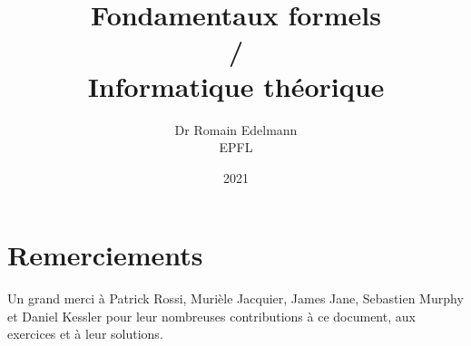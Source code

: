 \documentclass[12pt,french,a4paper]{memoir}
\begin{document}
\title{Fondamentaux formels\\/\\Informatique théorique}
\author{Dr Romain Edelmann\\EPFL}
\date{2021}
\maketitle

\frontmatter

\chapter*{Remerciements}

Un grand merci à Patrick Rossi, Murièle Jacquier, James Jane, Sebastien Murphy et Daniel Kessler pour leur nombreuses contributions à ce document, aux exercices et à leur solutions.

\newpage

\tableofcontents

\mainmatter








\end{document}
